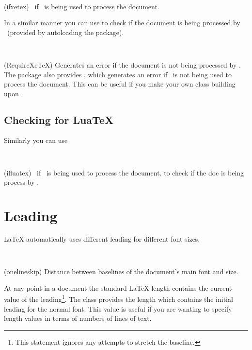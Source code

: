 \begin{syntax}
 \\
\end{syntax}
\glossary(ifxetex)%
  {}%
  {\ptrue\ if \xetx\ is being used to process the document.}

In a similar manner you can use  to check if the document
is being processed by \pixxetx\ (provided by autoloading the
 package).

\begin{syntax}
\cmd{\RequireXeTeX} \\
\end{syntax}
\glossary(RequireXeTeX)%
{}%
{Generates an error if the document is not being processed by \xetx.}
The  package also provides \cmd{\RequireXeTeX}, which
generates an error if \pixxetx\ is not being used to process the
document. This can be useful if you make your own class building upon
.

\subsection{Checking for LuaTeX}
\label{sec:checking-lualatex}

Similarly you can use 
\begin{syntax}
 \\
\end{syntax}
\glossary(ifluatex)%
  {}%
  {\ptrue\ if \luatx\ is being used to process the document.}
to check if the doc is being process by  \luatx.


\section{Leading}

    LaTeX automatically uses different leading for different
font sizes. 
\begin{syntax}
\lnc{\baselineskip} \lnc{\onelineskip} \\
\end{syntax}
\glossary(onelineskip)%
  {}%
  {Distance between baselines of the document's main font and size.}

At any point in a document the standard LaTeX \lnc{\baselineskip} length
contains the current value of the leading\footnote{This statement ignores
any attempts to stretch the baseline.}. The class provides the length
\lnc{\onelineskip} which contains the initial leading for the normal
font. This value is useful if you are wanting to specify length values
in terms of numbers of lines of text.

